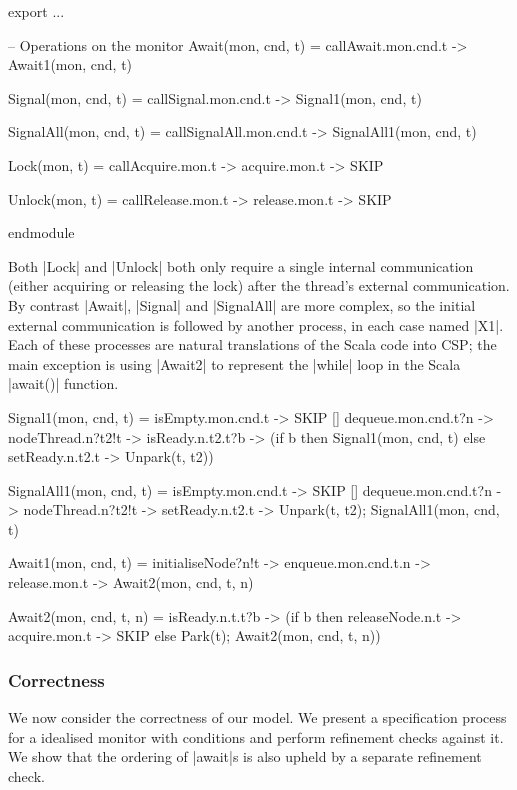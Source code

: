 \begin{cspm}
export 
  ...

  -- Operations on the monitor
  Await(mon, cnd, t) = callAwait.mon.cnd.t -> Await1(mon, cnd, t)

  Signal(mon, cnd, t) = callSignal.mon.cnd.t -> Signal1(mon, cnd, t)

  SignalAll(mon, cnd, t) = callSignalAll.mon.cnd.t -> SignalAll1(mon, cnd, t)

  Lock(mon, t) = callAcquire.mon.t -> acquire.mon.t -> SKIP

  Unlock(mon, t) = callRelease.mon.t -> release.mon.t -> SKIP

 endmodule
\end{cspm}

Both |Lock| and |Unlock| both only require a single internal communication (either acquiring or releasing the lock) after the thread's external communication. By contrast |Await|, |Signal| and |SignalAll| are more complex, so the initial external communication is followed by another process, in each case named |X1|. Each of these processes are natural translations of the Scala code into CSP; the main exception is using |Await2| to represent the |while| loop in the Scala |await()| function.

\begin{cspm}
Signal1(mon, cnd, t) = 
      isEmpty.mon.cnd.t -> SKIP
  [] dequeue.mon.cnd.t?n -> nodeThread.n?t2!t -> isReady.n.t2.t?b ->
        (if b then Signal1(mon, cnd, t)
        else setReady.n.t2.t -> Unpark(t, t2))

SignalAll1(mon, cnd, t) =
      isEmpty.mon.cnd.t -> SKIP
  [] dequeue.mon.cnd.t?n -> nodeThread.n?t2!t -> setReady.n.t2.t -> 
          Unpark(t, t2); SignalAll1(mon, cnd, t)

Await1(mon, cnd, t) = 
  initialiseNode?n!t -> enqueue.mon.cnd.t.n -> release.mon.t -> Await2(mon, cnd, t, n)

Await2(mon, cnd, t, n) = 
  isReady.n.t.t?b -> (if b then releaseNode.n.t -> acquire.mon.t -> SKIP
                      else Park(t); Await2(mon, cnd, t, n))
\end{cspm}



\subsubsection{Correctness}\label{section:SCLMonitor-Correctness}

We now consider the correctness of our model. We present a specification process for a idealised monitor with conditions and perform refinement checks against it. We show that the ordering of |await|s is also upheld by a separate refinement check.
  

